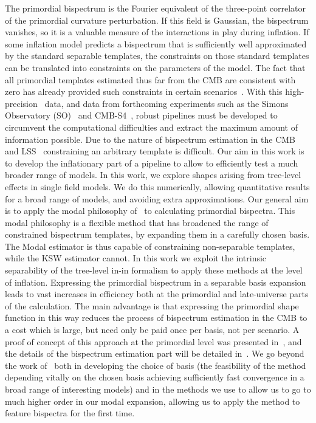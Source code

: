 The primordial bispectrum is the Fourier equivalent of the
three-point correlator of the primordial curvature perturbation.
If this field is Gaussian, the bispectrum vanishes, so
it is a valuable measure of the interactions in play during inflation.
If some inflation model predicts a bispectrum that is sufficiently well approximated by
the standard separable templates, the constraints on those standard templates
can be translated into constraints on the parameters of the model.
The fact that all primordial templates estimated thus far from the CMB
are consistent with zero has already provided such constraints
in certain scenarios~\cite{Planck_NG_2015, Planck_NG_2018}.
With this high-precision \planck~data, and data from forthcoming experiments
such as the Simons Observatory (SO)~\cite{simons}
and CMB-S4~\cite{abazajian2016cmbs4},
robust pipelines must be developed to circumvent the computational difficulties and
extract the maximum amount of information possible.
Due to the nature of bispectrum estimation in the CMB and
LSS~\cite{lss_baldauf,lss_karagiannis,chen_future_lss,Scoccimarro_2012}
constraining an arbitrary template is difficult.
Our aim in this work is to develop the inflationary part
of a pipeline to allow to efficiently test a much broader range of models.
In this work, we explore shapes arising from tree-level effects in single field models.
We do this numerically, allowing quantitative results for a broad
range of models, and avoiding extra approximations.
Our general aim is to apply the modal philosophy of~\cite{FergShell_1,FergShell_2,FergShell_3}
to calculating primordial bispectra.
This modal philosophy is a flexible method that has broadened the range of constrained
bispectrum templates, by expanding them in a carefully chosen basis.
The Modal estimator is thus capable of constraining
non-separable templates, while the KSW estimator cannot.
In this work we exploit the intrinsic separability of the
tree-level in-in formalism to apply these methods at the level of inflation.
Expressing the primordial bispectrum in a separable
basis expansion leads to vast increases in efficiency both at the primordial
and late-universe parts of the calculation.
The main advantage is that expressing the primordial shape function
in this way reduces the process of bispectrum estimation in the CMB to a
cost which is large, but need only be paid once per basis,
not per scenario.
A proof of concept of this approach at the primordial level was presented in~\cite{Funakoshi},
and the details of the bispectrum estimation part will be detailed in~\cite{Sohn_2021}.
We go beyond the work of~\cite{Funakoshi} both in developing the choice of basis
(the feasibility of the method depending vitally on the chosen basis
achieving sufficiently fast convergence in a broad range of interesting models)
and in the methods we use to allow us to go to much higher order in our modal expansion,
allowing us to apply the method to feature bispectra for the first time.


